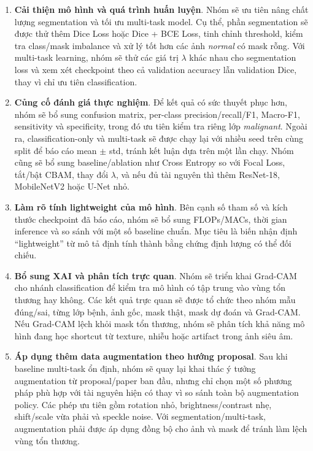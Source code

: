 \documentclass[12pt,a4paper]{article}
\begin{document}
\begin{enumerate}[label=\textbf{G\arabic*.}]
    \item \textbf{Cải thiện mô hình và quá trình huấn luyện}. Nhóm sẽ ưu tiên nâng chất lượng segmentation và tối ưu multi-task model. Cụ thể, phần segmentation sẽ được thử thêm Dice Loss hoặc Dice + BCE Loss, tinh chỉnh threshold, kiểm tra class/mask imbalance và xử lý tốt hơn các ảnh \textit{normal} có mask rỗng. Với multi-task learning, nhóm sẽ thử các giá trị \(\lambda\) khác nhau cho segmentation loss và xem xét checkpoint theo cả validation accuracy lẫn validation Dice, thay vì chỉ ưu tiên classification.

    \item \textbf{Củng cố đánh giá thực nghiệm}. Để kết quả có sức thuyết phục hơn, nhóm sẽ bổ sung confusion matrix, per-class precision/recall/F1, Macro-F1, sensitivity và specificity, trong đó ưu tiên kiểm tra riêng lớp \textit{malignant}. Ngoài ra, classification-only và multi-task sẽ được chạy lại với nhiều seed trên cùng split để báo cáo mean \(\pm\) std, tránh kết luận dựa trên một lần chạy. Nhóm cũng sẽ bổ sung baseline/ablation như Cross Entropy so với Focal Loss, tắt/bật CBAM, thay đổi \(\lambda\), và nếu đủ tài nguyên thì thêm ResNet-18, MobileNetV2 hoặc U-Net nhỏ.

    \item \textbf{Làm rõ tính lightweight của mô hình}. Bên cạnh số tham số và kích thước checkpoint đã báo cáo, nhóm sẽ bổ sung FLOPs/MACs, thời gian inference và so sánh với một số baseline chuẩn. Mục tiêu là biến nhận định ``lightweight'' từ mô tả định tính thành bằng chứng định lượng có thể đối chiếu.

    \item \textbf{Bổ sung XAI và phân tích trực quan}. Nhóm sẽ triển khai Grad-CAM cho nhánh classification để kiểm tra mô hình có tập trung vào vùng tổn thương hay không. Các kết quả trực quan sẽ được tổ chức theo nhóm mẫu đúng/sai, từng lớp bệnh, ảnh gốc, mask thật, mask dự đoán và Grad-CAM. Nếu Grad-CAM lệch khỏi mask tổn thương, nhóm sẽ phân tích khả năng mô hình đang học shortcut từ texture, nhiễu hoặc artifact trong ảnh siêu âm.

    \item \textbf{Áp dụng thêm data augmentation theo hướng proposal}. Sau khi baseline multi-task ổn định, nhóm sẽ quay lại khai thác ý tưởng augmentation từ proposal/paper ban đầu, nhưng chỉ chọn một số phương pháp phù hợp với tài nguyên hiện có thay vì so sánh toàn bộ augmentation policy. Các phép ưu tiên gồm rotation nhỏ, brightness/contrast nhẹ, shift/scale vừa phải và speckle noise. Với segmentation/multi-task, augmentation phải được áp dụng đồng bộ cho ảnh và mask để tránh làm lệch vùng tổn thương.
\end{enumerate}
\end{document}
